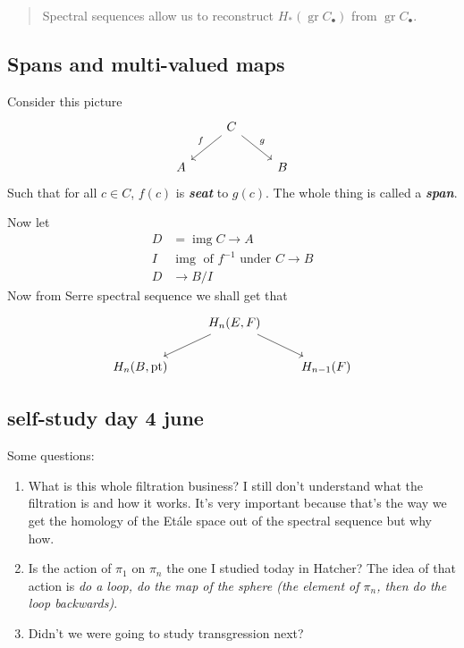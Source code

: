 \documentclass{article}
\DeclareMathOperator{\img}{img}
\DeclareMathOperator{\pt}{pt}
\DeclareMathOperator{\gr}{gr}
\begin{document}
\begin{quotation}
	Spectral sequences allow us to reconstruct $H_*(\gr C_\bullet)$ from $\gr C_\bullet$.
\end{quotation}
\subsection{Spans and multi-valued maps}
Consider this picture
\[\begin{tikzcd}
	&C\arrow[dl,"f",swap]\arrow[dr,"g"]\\
	A&&B
\end{tikzcd}\]
Such that for all $c\in C$, $f(c)$ is \textbf{\textit{seat}} to $g(c)$. The whole thing is called a \textbf{\textit{span}}.

Now let
\begin{align*}
	D&=\img C\to A\\
	I&\img \text{ of }f^{-1}\text{ under }C\to B\\
	D&\to B/I
\end{align*}
Now from Serre spectral sequence we shall get that
\[\begin{tikzcd}
	&H_n(E,F)\arrow[dl]\arrow[dr]\\
	H_n(B,\pt)&&H_{n-1}(F)
\end{tikzcd}\]

\subsection{self-study day 4 june}
Some questions:
\begin{enumerate}
	\item What is this whole filtration business? I still don't understand what the filtration is and how it works. It's very important because that's the way we get the homology of the Etále space out of the spectral sequence but why how.
	\item Is the action of $\pi_1$ on $\pi_n$ the one I studied today in Hatcher? The idea of that action is \textit{do a loop, do the map of the sphere (the element of $\pi_n$, then do the loop backwards)}.
	\item Didn't we were going to study transgression next?
\end{enumerate}
\clearpage
\printbibliography
\end{document}
